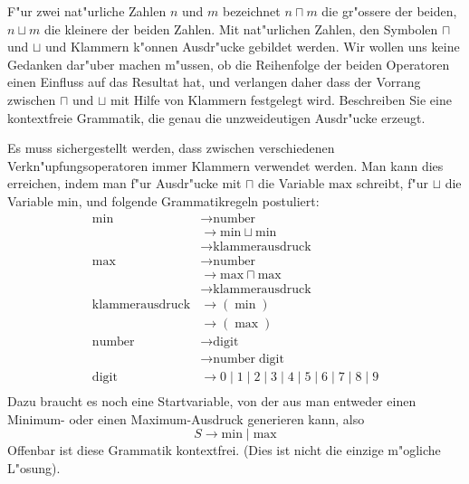 F"ur zwei nat"urliche Zahlen $n$ und $m$ bezeichnet $n\sqcap m$ die
gr"ossere der beiden, $n\sqcup m$ die kleinere der beiden Zahlen.
Mit nat"urlichen Zahlen, den Symbolen $\sqcap$ und $\sqcup$ und Klammern
k"onnen Ausdr"ucke gebildet werden.
Wir wollen uns keine Gedanken dar"uber machen m"ussen, ob die Reihenfolge
der beiden Operatoren einen Einfluss auf das Resultat hat, und
verlangen daher
dass der Vorrang zwischen $\sqcap$ und $\sqcup$ mit Hilfe
von Klammern festgelegt wird. Beschreiben Sie eine
kontextfreie Grammatik, die genau die unzweideutigen Ausdr"ucke
erzeugt.

\begin{loesung}
Es muss sichergestellt werden, dass zwischen verschiedenen
Verkn"upfungsoperatoren immer Klammern verwendet werden. Man kann
dies erreichen, indem man f"ur Ausdr"ucke mit $\sqcap$ die Variable
$\text{max}$ schreibt, f"ur $\sqcup$ die Variable $\text{min}$, und
folgende Grammatikregeln postuliert:
\begin{align*}
\text{min}&\rightarrow \text{number}\\
&\rightarrow \text{min}\sqcup \text{min}\\
&\rightarrow\text{klammerausdruck}\\
\text{max}&\rightarrow \text{number}\\
&\rightarrow \text{max}\sqcap \text{max}\\
&\rightarrow\text{klammerausdruck}\\
\text{klammerausdruck}&\rightarrow (\;\text{min}\;)\\
&\rightarrow (\;\text{max}\;)\\
\text{number}&\rightarrow\text{digit}\\
&\rightarrow\text{number}\;\text{digit}\\
\text{digit}&\rightarrow 0
\;|\;1
\;|\;2
\;|\;3
\;|\;4
\;|\;5
\;|\;6
\;|\;7
\;|\;8
\;|\;9
\\
\end{align*}
Dazu braucht es noch eine Startvariable, von der aus man entweder einen
Minimum- oder einen Maximum-Ausdruck generieren kann, also
$$S\rightarrow \text{min}\;|\;\text{max}$$
Offenbar ist diese Grammatik kontextfrei.
(Dies ist nicht die einzige m"ogliche L"osung).
\end{loesung}
